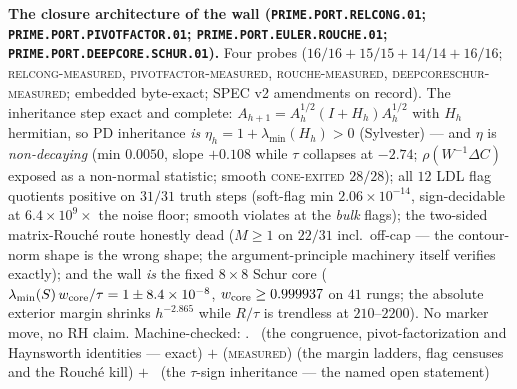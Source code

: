 \par\smallskip\noindent\textbf{The closure architecture of the
wall (\texttt{PRIME.PORT.\allowbreak RELCONG.01};
\texttt{PRIME.PORT.\allowbreak PIVOTFACTOR.01};
\texttt{PRIME.PORT.EULER.\allowbreak ROUCHE.01};
\texttt{PRIME.PORT.DEEPCORE.\allowbreak SCHUR.01}).}
Four probes ($16/16 + 15/15 + 14/14 + 16/16$;
\textsc{relcong-measured}, \textsc{pivotfactor-measured},
\textsc{rouche-measured}, \textsc{deepcoreschur-measured};
embedded byte-exact; SPEC v2 amendments on record).  The
inheritance step exact and complete: $A_{h+1} = A_h^{1/2}(I +
H_h)A_h^{1/2}$ with $H_h$ hermitian, so PD inheritance
\emph{is} $\eta_h = 1 + \lambda_{\min}(H_h) > 0$ (Sylvester)
--- and $\eta$ is \emph{non-decaying} (min $0.0050$, slope
$+0.108$ while $\tau$ collapses at $-2.74$; $\rho(W^{-1}\Delta
C)$ exposed as a non-normal statistic; smooth
\textsc{cone-exited} $28/28$); all $12$ LDL flag quotients
positive on $31/31$ truth steps (soft-flag min
$2.06\times10^{-14}$, sign-decidable at $6.4\times10^{9}\times$
the noise floor; smooth violates at the \emph{bulk} flags); the
two-sided matrix-Rouch\'e route honestly dead ($M \ge 1$ on
$22/31$ incl.\ off-cap --- the contour-norm shape is the wrong
shape; the argument-principle machinery itself verifies
exactly); and the wall \emph{is} the fixed $8\times8$ Schur
core ($\lambda_{\min}(S)\,w_{\rm core}/\tau = 1 \pm
8.4\times10^{-8}$, $w_{\rm core} \ge 0.999937$ on $41$ rungs;
the absolute exterior margin shrinks $h^{-2.865}$ while
$R/\tau$ is trendless at $210$--$2200$).  No marker move, no
RH claim.
Machine-checked: .
\mE\ (the congruence, pivot-factorization and Haynsworth
identities --- exact) $+$ (\textsc{measured}) (the margin
ladders, flag censuses and the Rouch\'e kill) $+$ \mO\ (the
$\tau$-sign inheritance --- the named open statement)
\par\smallskip


